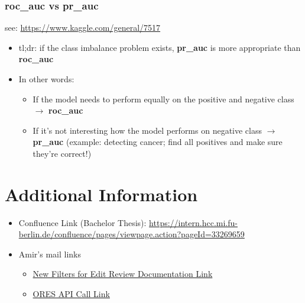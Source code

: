 \documentclass[12pt,a4paper]{article}
\begin{document}
\subsubsection{roc\_auc vs pr\_auc}
see: \url{https://www.kaggle.com/general/7517}
\begin{itemize}
\item tl;dr: if the class imbalance problem exists, \textbf{pr\_auc} is more appropriate than \textbf{roc\_auc}
\item In other words: 
\begin{itemize}
\item If the model needs to perform equally on the positive and negative class $\rightarrow$ \textbf{roc\_auc}
\item If it's not interesting how the model performs on negative class $\rightarrow$ \textbf{pr\_auc} (example: detecting cancer; find all positives and make sure they're correct!)
\end{itemize}
\end{itemize}
%
%
%
\newpage
\section*{Additional Information}
\begin{itemize}
\item Confluence Link (Bachelor Thesis): \url{https://intern.hcc.mi.fu-berlin.de/confluence/pages/viewpage.action?pageId=33269659}
\item Amir's mail links
\begin{itemize}
\item \href{https://www.mediawiki.org/wiki/Help:New_filters_for_edit_review/Quality_and_Intent_Filters}{New Filters for Edit Review Documentation Link}
\item \href{https://ores.wikimedia.org/v3/scores/eswiki/?models=damaging&model_info=statistics.thresholds.false.%22maximum+recall+%40+precision+%3E%3D+0.995%22%7Cstatistics.thresholds.true.%22maximum+filter_rate+%40+recall+%3E%3D+0.9%22%7Cstatistics.thresholds.true.%22maximum+recall+%40+precision+%3E%3D+0.6%22%7Cstatistics.thresholds.true.%22maximum+recall+%40+precision+%3E%3D+0.9%22&format=json}{ORES API Call Link}
\end{itemize}
\end{itemize}
\end{document}
